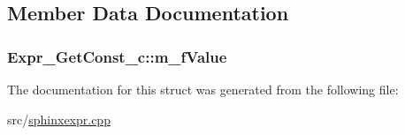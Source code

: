 \subsection{Member Data Documentation}
\hypertarget{structExpr__GetConst__c_a2c9489694b2a31a87619045a1fcd6363}{
\subsubsection[{m\-\_\-f\-Value}]{ Expr\-\_\-\-Get\-Const\-\_\-c\-::m\-\_\-f\-Value}}\label{structExpr__GetConst__c_a2c9489694b2a31a87619045a1fcd6363}


The documentation for this struct was generated from the following file\-:\begin{DoxyCompactItemize}
\item 
src/\hyperlink{sphinxexpr_8cpp}{sphinxexpr.\-cpp}\end{DoxyCompactItemize}
